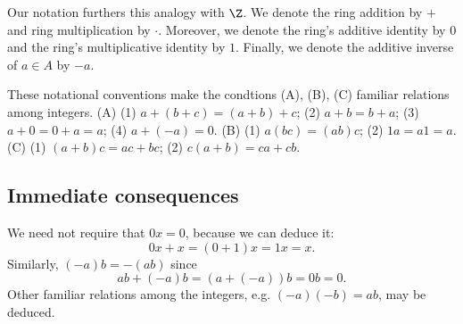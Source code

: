 Our notation furthers this analogy with $\Z $.
We denote the ring addition by $+$ and ring multiplication by $\cdot $.
Moreover, we denote the ring's additive identity by $0$ and the ring's multiplicative identity by $1$.
Finally, we denote the additive inverse of $a \in A$ by $-a$.

These notational conventions make the condtions (A), (B), (C) familiar relations among integers.
(A) (1) $a+(b + c) = (a+b)+c$; (2) $a+b = b+a$; (3) $a + 0 = 0 + a = a$; (4) $a + (-a) = 0$.
(B) (1) $a(bc) = (ab)c$; (2) $1a = a1 = a$.
(C) (1) $(a+b)c = ac + bc$; (2) $c(a+b) = ca + cb$.

\subsection*{Immediate consequences}

We need not require that $0x = 0$, because we can deduce it:
  \[
0x + x = (0 + 1)x = 1x = x.
  \]
Similarly, $(-a)b = -(ab)$ since
  \[
ab + (-a)b = (a + (-a))b = 0b = 0.
  \]
Other familiar relations among the integers, e.g. $(-a)(-b) = ab$, may be deduced.
